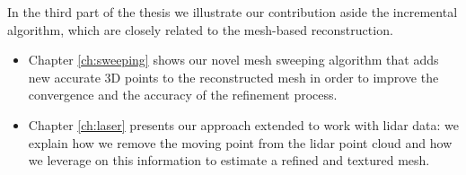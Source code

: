 In the third part of the thesis we illustrate our contribution aside the incremental algorithm, which are closely related to the mesh-based reconstruction.

\begin{itemize}
 \item Chapter \ref{ch:sweeping} shows our novel mesh sweeping algorithm that adds new accurate 3D points to the reconstructed mesh in order to  improve the convergence and the accuracy of the refinement process.
 \item Chapter \ref{ch:laser} presents our approach extended to work with lidar data: we explain how we remove the moving point from the lidar point cloud and how we leverage on this information to estimate a refined and textured mesh.
\end{itemize}















